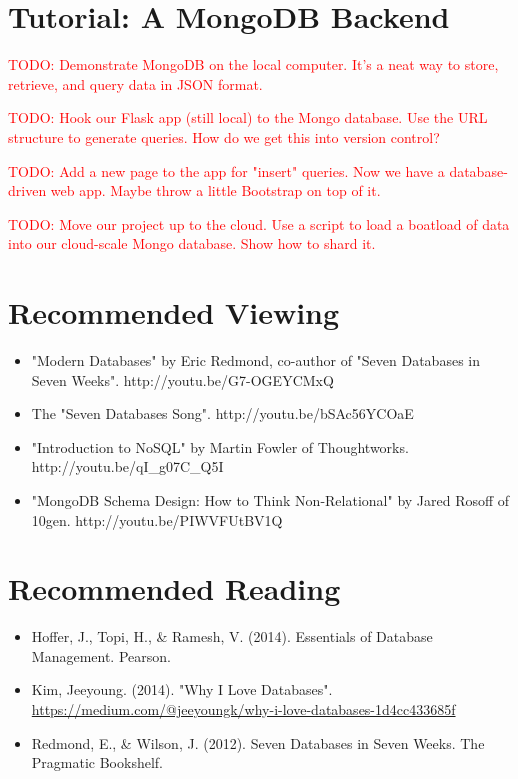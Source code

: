 \documentclass[11pt]{book}
\newcommand{\todo}[1]{\textcolor{red}{TODO: #1}} %
\begin{document}
\section*{Tutorial: A MongoDB Backend}

\todo{Demonstrate MongoDB on the local computer.  It's a neat way to store, retrieve, and query data in JSON format.}

\todo{Hook our Flask app (still local) to the Mongo database. Use the URL structure to generate queries. How do we get this into version control?}

\todo{Add a new page to the app for "insert" queries.  Now we have a database-driven web app.  Maybe throw a little Bootstrap on top of it.}

\todo{Move our project up to the cloud.  Use a script to load a boatload of data into our cloud-scale Mongo database.  Show how to shard it.}

\section*{Recommended Viewing}
\begin{itemize}
    \item "Modern Databases" by Eric Redmond, co-author of "Seven Databases in Seven Weeks".  http://youtu.be/G7-OGEYCMxQ
    \item The "Seven Databases Song".  http://youtu.be/bSAc56YCOaE
    \item "Introduction to NoSQL" by Martin Fowler of Thoughtworks.\\ http://youtu.be/qI\_g07C\_Q5I
    \item "MongoDB Schema Design: How to Think Non-Relational" by Jared Rosoff of 10gen.  http://youtu.be/PIWVFUtBV1Q
\end{itemize}

\section*{Recommended Reading}
\begin{itemize}
    \item Hoffer, J., Topi, H., \& Ramesh, V. (2014). Essentials of Database Management. Pearson.
    \item Kim, Jeeyoung. (2014). "Why I Love Databases". \url{https://medium.com/@jeeyoungk/why-i-love-databases-1d4cc433685f}
    \item Redmond, E., \& Wilson, J. (2012). Seven Databases in Seven Weeks.  The Pragmatic Bookshelf.
\end{itemize}
\end{document}
